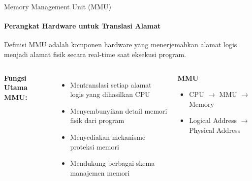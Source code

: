 \documentclass[10pt,aspectratio=169]{beamer}
\begin{document}
\begin{frame}{Memory Management Unit (MMU)}
    \framesubtitle{Perangkat Hardware untuk Translasi Alamat}
    
    \begin{block}{Definisi}
        MMU adalah komponen hardware yang menerjemahkan alamat logis menjadi alamat fisik secara real-time saat eksekusi program.
    \end{block}
    
    \begin{columns}[T]
            \textbf{Fungsi Utama MMU:}
            \begin{itemize}
                \item Mentranslasi setiap alamat logis yang dihasilkan CPU
                \item Menyembunyikan detail memori fisik dari program
                \item Menyediakan mekanisme proteksi memori
                \item Mendukung berbagai skema manajemen memori
            \end{itemize}
            
            \begin{center}
            \textbf{MMU}
            \begin{itemize}
                \item CPU $\rightarrow$ MMU $\rightarrow$ Memory
                \item Logical Address $\rightarrow$ Physical Address
            \end{itemize}
            \end{center}
    \end{columns}
\end{frame}
\end{document}
